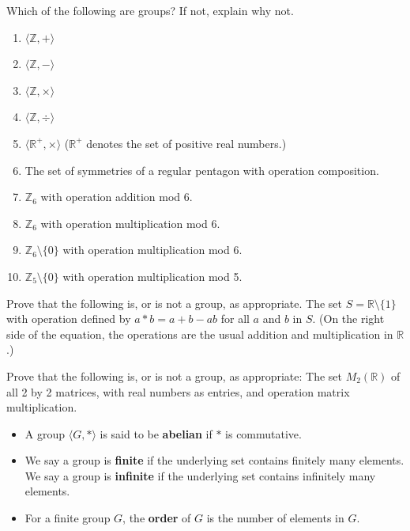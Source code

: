 \begin{problem}\label{prob:groupex}
Which of the following are groups? If not, explain why not.
\begin{enumerate}
  \item  \(\langle \mathbb{Z}, + \rangle\)
  \item  \(\langle \mathbb{Z}, - \rangle\)
  \item  \(\langle \mathbb{Z}, \times \rangle\)
  \item  \(\langle \mathbb{Z}, \div \rangle\)
  \item  \(\langle \mathbb{R}^+, \times \rangle\) (\(\mathbb{R}^+\) denotes the set of positive real numbers.)
  \item  The set of symmetries of a regular pentagon with operation composition.
  \item  \(\mathbb{Z}_6\) with operation addition mod 6.
  \item  \(\mathbb{Z}_6\) with operation multiplication mod 6.
  \item  \(\mathbb{Z}_6 \setminus \{0\}\) with operation multiplication mod 6.
  \item  \(\mathbb{Z}_5 \setminus \{0\}\) with operation multiplication mod 5.
\end{enumerate}
\end{problem}

\begin{problem}
Prove that the following is, or is not a group, as appropriate.
The set \( S = \mathbb{R} \setminus \{1\} \) with operation defined by \( a * b = a + b - ab \) for all \(a\) and \(b\) in \(S\). (On the right side of the equation, the operations are the usual addition and multiplication in \(\mathbb{R} \).)
\end{problem}

\begin{problem}
Prove that the following is, or is not a group, as appropriate: The set \(M_2(\mathbb{R})\) of all 2 by 2 matrices, with real numbers as entries, and operation matrix multiplication.
\end{problem}

\begin{definition}
\begin{itemize}
  \item A group \( \langle G, * \rangle \) is said to be \textbf{abelian} if \(*\) is commutative.
  \item We say a group is \textbf{finite} if the underlying set contains finitely many elements. We say a group is \textbf{infinite} if the underlying set contains infinitely many elements.
  \item For a finite group \(G\), the \textbf{order} of \(G\) is the number of elements in \(G\).
\end{itemize}
\end{definition}

